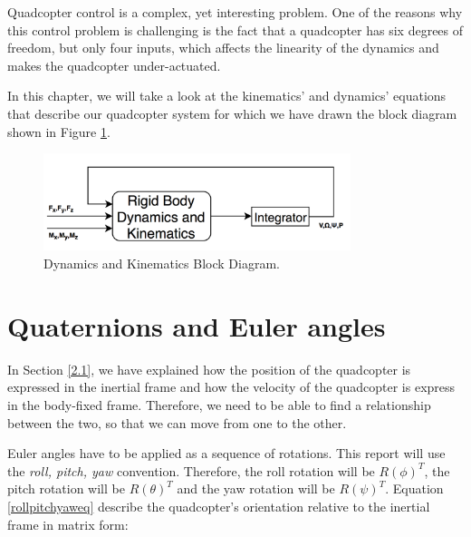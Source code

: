 Quadcopter control is a complex, yet interesting problem. One of the reasons why this control problem is challenging is the fact that a quadcopter has six degrees of freedom, but only four inputs, which affects the linearity of the dynamics and makes the quadcopter under-actuated. 

In this chapter, we will take a look at the kinematics' and dynamics' equations that describe our quadcopter system for which we have drawn the block diagram shown in Figure \ref{dk}.

\begin{figure}[H]
  \centering
    \includegraphics[width=0.8\textwidth]{images/blockdiagram.png}
	\caption{Dynamics and Kinematics Block Diagram.}
	\label{dk}
\end{figure}

\section{Quaternions and Euler angles}\label{quat}
In Section \ref{2.1}, we have explained how the position of the quadcopter is expressed in the inertial frame and how the  velocity of the quadcopter is express in the body-fixed frame. Therefore, we need to be able to find a relationship between the two, so that we can move from one to the other.

Euler angles have to be applied as a sequence of rotations. This report will use the \textit{roll, pitch, yaw} convention. Therefore, the roll rotation will be $R(\phi)^{T}$, the pitch rotation will be $R(\theta)^{T}$ and the yaw rotation will be $R(\psi)^{T}$. Equation \ref{rollpitchyaweq} describe the quadcopter's orientation relative to the inertial frame in matrix form:

